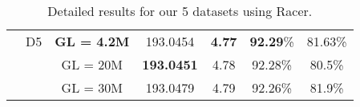 \begin{table}
\begin{tabular}{ |c|c|c|c|c|c|c| }
                         & D5 & \textbf{GL = 4.2M} & 193.0454 & \textbf{4.77} & \textbf{92.29}\% & 81.63\%\\
                         &  & GL = 20M & \textbf{193.0451} & 4.78  & 92.28\% & 80.5\% \\
                         &  & GL = 30M & 193.0479 & 4.79  & 92.26\% & 81.9\% \\
  \hline
  \end{tabular}
\caption {Detailed results for our 5 datasets using Racer.}
\label{tb1:Racer-Perplexity-vs-Alignment}
\end{table}

\begin{comment}
\begin{table}
\begin{center}
\small
\begin{tabular}{ |c|c|c|c|c|c| } 
\hline
EC Tool & {Dataset} & Tuned Parameter & {perplexity (RNN)} & {perplexity (N-Gram)} & {overall alignment rate} \\ 
 \hline
 					  &  & k = 10 & 103.00579 & 20.42 & 97.45\% \\ 
 					  & D1 & k = 15 & 103.0048 & 16.86 & 98.83\% \\ 
 					  &  & \textbf{k = 17} & \textbf{103.004} &  \textbf{16.7}  & \textbf{98.95}\% \\ 
 					  &  & k = 25 &  103.00551 &  18.22 & 97.98\%  
\\\cline{2-6}
     					  &  & k = 10 & 204.849 & 121.88 & 56.9\% \\ 
						  & D2 & \textbf{k = 15} & 204.775 & 102.13 & \textbf{61.42\%} \\ 
     					  &  & k = 17 &  \textbf{204.76} &  \textbf{100.30}  & 61.15\% \\
     					  &  & k = 25 & 204.795 & 107.37 & 59.19\% 
 \\\cline{2-6}
     		\multirow{4}{*}{Lighter} &  & k = 10 & 200.513 & 52.81 & 72.91\% \\ 
     					  & D3 & \textbf{k = 15} & \textbf{200.432} & 33.2602 & \textbf{80.44\%} \\ 

\end{comment}
